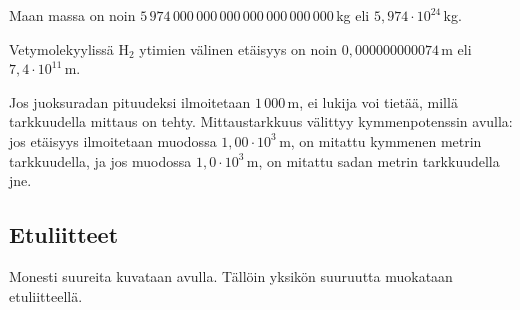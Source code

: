 \begin{esimerkki}
Maan massa on noin $5\,974\,000\,000\,000\,000\,000\,000\,000$\,kg  eli $5,974\cdot10^{24}$\,kg.
\end{esimerkki}

\begin{esimerkki}
Vetymolekyylissä H$_2$ ytimien välinen etäisyys on noin $0,000000000074$\,m eli $7,4\cdot10^{11}$\,m. 
\end{esimerkki}

\begin{esimerkki}
Jos juoksuradan pituudeksi ilmoitetaan $1\,000$\,m, ei lukija voi tietää, millä tarkkuudella mittaus on tehty. Mittaustarkkuus välittyy kymmenpotenssin avulla: jos etäisyys ilmoitetaan muodossa $1,00\cdot10^{3}$\,m, on mitattu kymmenen metrin tarkkuudella, ja jos muodossa $1,0\cdot10^{3}$\,m, on mitattu sadan metrin tarkkuudella jne.
\end{esimerkki}

\subsection*{Etuliitteet}

Monesti suureita kuvataan  avulla. Tällöin yksikön suuruutta muokataan etuliitteellä.

